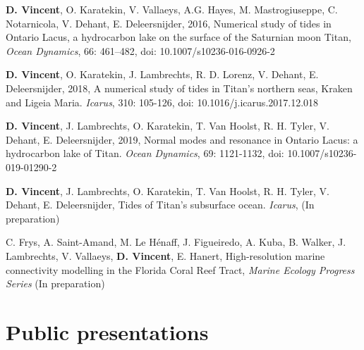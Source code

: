 \begin{list}{}{%
\setlength{\topsep}{0pt}%
\setlength{\leftmargin}{0.23in}%
\setlength{\listparindent}{-0.23in}%
\setlength{\itemindent}{-0.23in}%
\setlength{\parsep}{\parskip}%
}%


\item \textbf{D. Vincent}, O. Karatekin, V. Vallaeys, A.G. Hayes, M. Mastrogiuseppe, C. Notarnicola, V. Dehant, E. Deleersnijder, 2016, Numerical study of tides in Ontario Lacus, a hydrocarbon lake on the surface of the Saturnian moon Titan, \textit{Ocean Dynamics}, 66: 461--482, doi: 10.1007/s10236-016-0926-2

\item \textbf{D. Vincent}, O. Karatekin, J. Lambrechts, R. D. Lorenz, V. Dehant, E. Deleersnijder, 2018, A numerical study of tides in Titan's northern seas, Kraken and Ligeia Maria. \textit{Icarus}, 310: 105-126, doi: 10.1016/j.icarus.2017.12.018


\item \textbf{D. Vincent}, J. Lambrechts, O. Karatekin, T. Van Hoolst, R. H. Tyler, V. Dehant, E. Deleersnijder, 2019, Normal modes and resonance in Ontario Lacus: a hydrocarbon lake of Titan. \textit{Ocean Dynamics}, 69: 1121-1132, doi: 10.1007/s10236-019-01290-2

\item \textbf{D. Vincent}, J. Lambrechts, O. Karatekin, T. Van Hoolst, R. H. Tyler, V. Dehant, E. Deleersnijder, Tides of Titan's subsurface ocean. \textit{Icarus}, (In preparation)


\item C. Frys, A. Saint-Amand, M. Le Hénaff, J. Figueiredo, A. Kuba, B. Walker, J. Lambrechts, V. Vallaeys, \textbf{D. Vincent}, E. Hanert, High-resolution marine connectivity modelling in the Florida Coral Reef Tract, \textit{Marine Ecology Progress Series} (In preparation)
\end{list}

\section*{Public presentations}


